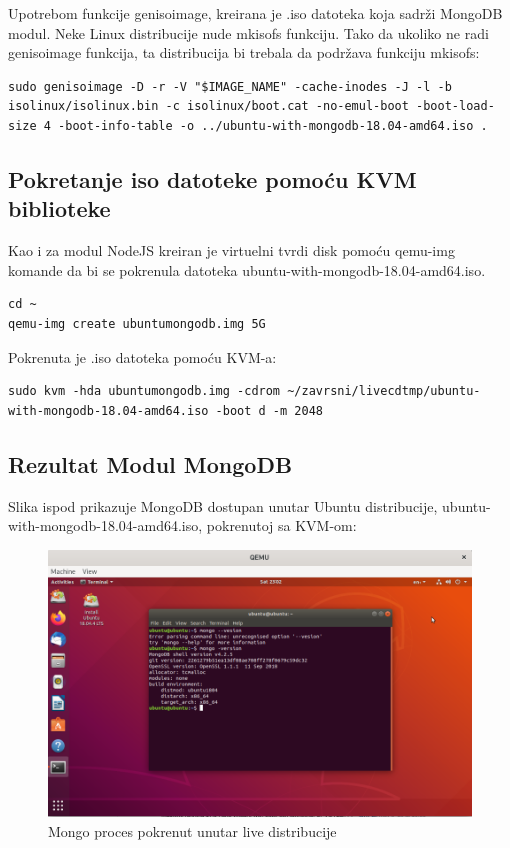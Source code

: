 \documentclass[12pt,vi]{mitthesis}
\begin{document}
\noindent
Upotrebom funkcije genisoimage, kreirana je .iso datoteka koja sadrži MongoDB modul. Neke Linux distribucije nude mkisofs funkciju. Tako da ukoliko ne radi genisoimage funkcija, ta distribucija bi trebala da podržava funkciju mkisofs:
\begin{lstlisting}[style=BashInputStyle]
sudo genisoimage -D -r -V "$IMAGE_NAME" -cache-inodes -J -l -b isolinux/isolinux.bin -c isolinux/boot.cat -no-emul-boot -boot-load-size 4 -boot-info-table -o ../ubuntu-with-mongodb-18.04-amd64.iso .
\end{lstlisting}

\subsection*{Pokretanje iso datoteke pomoću KVM biblioteke}
\indent
Kao i za modul NodeJS kreiran je virtuelni tvrdi disk pomoću qemu-img komande da bi se pokrenula datoteka ubuntu-with-mongodb-18.04-amd64.iso.
\begin{lstlisting}[style=BashInputStyle]
cd ~
qemu-img create ubuntumongodb.img 5G
\end{lstlisting}

\noindent 
Pokrenuta je .iso datoteka pomoću KVM-a:
\begin{lstlisting}[style=BashInputStyle]
sudo kvm -hda ubuntumongodb.img -cdrom ~/zavrsni/livecdtmp/ubuntu-with-mongodb-18.04-amd64.iso -boot d -m 2048
\end{lstlisting}

\subsection*{Rezultat Modul MongoDB}
\indent
Slika ispod prikazuje MongoDB dostupan unutar Ubuntu distribucije, ubuntu-with-mongodb-18.04-amd64.iso, pokrenutoj sa KVM-om:
\begin{figure}[!htb]
\centering
\includegraphics[width=\linewidth]{images/mongoLive.png}
\caption{Mongo proces pokrenut unutar live distribucije}
\end{figure}
\end{document}
